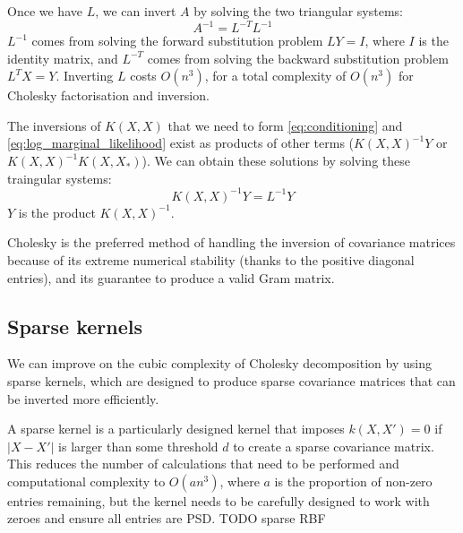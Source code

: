 Once we have $L$, we can invert $A$ by solving the two triangular systems:
\begin{equation*}
    A^{-1} = L^{-T} L^{-1}
\end{equation*}
$L^{-1}$ comes from solving the forward substitution problem $LY = I$, where $I$ is the identity matrix, and $L^{-T}$ comes from solving the backward substitution problem $L^TX = Y$. Inverting $L$ costs $O(n^3)$, for a total complexity of $O(n^3)$ for Cholesky factorisation and inversion. 

The inversions of $K(X, X)$ that we need to form \ref{eq:conditioning} and \ref{eq:log_marginal_likelihood} exist as products of other terms ($K(X,X)^{-1} Y$ or $K(X,X)^{-1} K(X, X_*)$). We can obtain these solutions by solving these traingular systems:
\begin{equation*}
    K(X, X)^{-1} Y = L^{-1} Y
\end{equation*}
$Y$ is the product $K(X, X)^{-1}$. 

Cholesky is the preferred method of handling the inversion of covariance matrices because of its extreme numerical stability (thanks to the positive diagonal entries), and its guarantee to produce a valid Gram matrix. 



\subsection{Sparse kernels}
We can improve on the cubic complexity of Cholesky decomposition by using sparse kernels, which are designed to produce sparse covariance matrices that can be inverted more efficiently.

A sparse kernel \cite{big-data} is a particularly designed kernel that imposes $k(X,X') = 0$ if $|X - X'|$ is larger than some threshold $d$ to create a sparse covariance matrix. This reduces the number of calculations that need to be performed and computational complexity to $O(an^3)$, where $a$ is the proportion of non-zero entries remaining, but the kernel needs to be carefully designed to work with zeroes and ensure all entries are PSD. TODO sparse RBF


